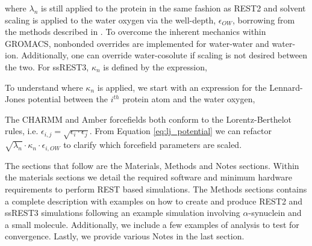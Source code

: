 where $\lambda_n$ is still applied to the protein in the same fashion as REST2 \cite{Wang2011} and solvent scaling is applied to the water oxygen via the well-depth, $\epsilon_{OW}$, borrowing from the methods described in \citeauthor{Best2010} \citeyear{Best2010}. 
To overcome the inherent mechanics within GROMACS\cite{VanDerSpoel2005}, nonbonded overrides are implemented for water-water and water-ion.
Additionally, one can override water-cosolute if scaling is not desired between the two. 
For ssREST3, $\kappa_n$ is defined by the expression, 


To understand where $\kappa_n$ is applied, we start with an expression for the Lennard-Jones potential between the $i^{th}$ protein atom and the water oxygen,


The CHARMM and Amber forcefields both conform to the Lorentz-Berthelot rules, i.e. $\epsilon_{i,j}=\sqrt{\epsilon_i\cdot \epsilon_j}$. From Equation \ref{eq:lj_potential} we can refactor $\sqrt{\lambda_n}\cdot\kappa_n\cdot\epsilon_{i,OW}$ to clarify which forcefield parameters are scaled. 


The sections that follow are the Materials, Methods and Notes sections.
Within the materials sections we detail the required software and minimum hardware requirements to perform REST based simulations.
The Methods sections contains a complete description with examples on how to create and produce REST2 and ssREST3 simulations following an example simulation involving $\alpha$-synuclein and a small molecule. Additionally, we include a few examples of analysis to test for convergence. Lastly, we provide various Notes in the last section. 